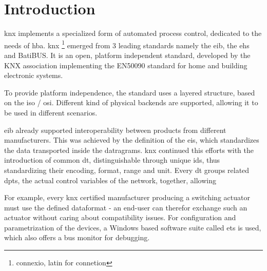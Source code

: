 \section{Introduction}

\gls{knx} implements a specialized form of automated process control, dedicated to the needs of \gls{hba}. \gls{knx} \footnote{connexio, latin for connetion}
emerged from 3 leading standards namely the \gls{eib}, the \gls{ehs} and BatiBUS. It is an open, platform independent standard,
developed by the KNX association implementing the EN50090 standard for home and building electronic systems.

To provide platform independence, the standard uses a layered structure, based on the \gls{iso} / \gls{osi}. Different kind of physical backends are supported,
allowing it to be used in different scenarios.

\gls{eib} already supported interoperability between products from different manufacturers. This was achieved by
the definition of the \gls{eis}, which standardizes
the data transported inside the datragrams. \gls{knx} continued this efforts with the introduction of common \gls{dt}, distinguishable through unique ids, thus
standardizing their encoding, format, range and unit.
Every \gls{dt} groups related \glspl{dpt}, the actual control variables of the network, together, allowing 

For example, every \gls{knx} 
certified manufacturer producing a switching actuator must use the defined dataformat - an end-user can therefor exchange such an actuator without caring
about compatibility issues. For configuration and parametrization of the devices, a Windows based software suite called \gls{ets} is used, which also offers
a bus monitor for debugging.
